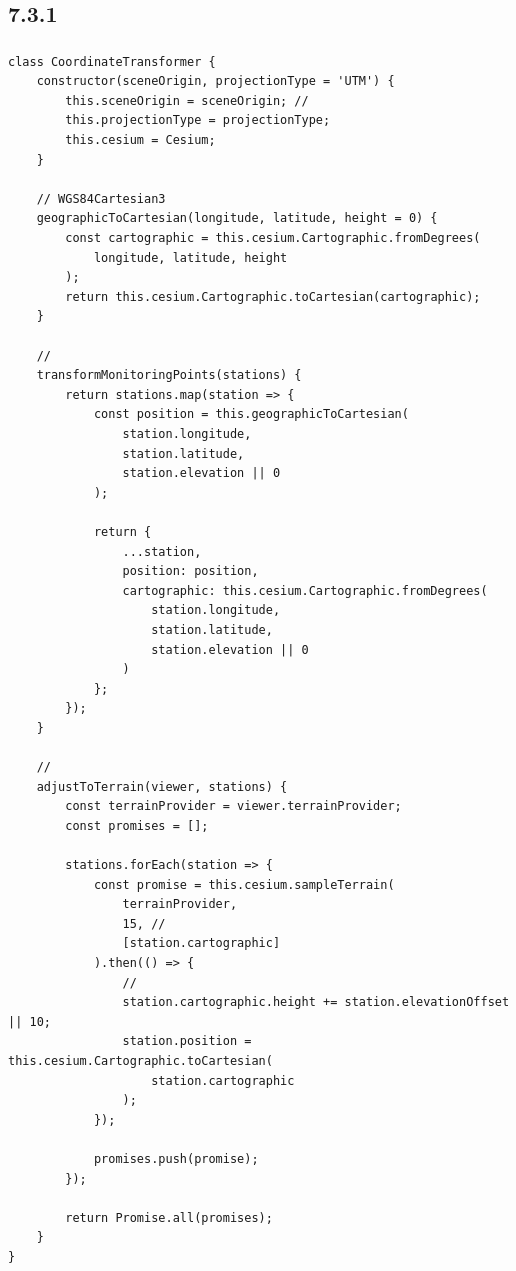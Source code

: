 \hypertarget{section-139}{%
\subsection{7.3.1}\label{section-139}}

\hypertarget{section-140}{%
\subsubsection{}\label{section-140}}

\hypertarget{section-141}{%
\paragraph{}\label{section-141}}

\begin{lstlisting}[style=javascript]
class CoordinateTransformer {
    constructor(sceneOrigin, projectionType = 'UTM') {
        this.sceneOrigin = sceneOrigin; // 
        this.projectionType = projectionType;
        this.cesium = Cesium;
    }
    
    // WGS84Cartesian3
    geographicToCartesian(longitude, latitude, height = 0) {
        const cartographic = this.cesium.Cartographic.fromDegrees(
            longitude, latitude, height
        );
        return this.cesium.Cartographic.toCartesian(cartographic);
    }
    
    // 
    transformMonitoringPoints(stations) {
        return stations.map(station => {
            const position = this.geographicToCartesian(
                station.longitude,
                station.latitude,
                station.elevation || 0
            );
            
            return {
                ...station,
                position: position,
                cartographic: this.cesium.Cartographic.fromDegrees(
                    station.longitude,
                    station.latitude,
                    station.elevation || 0
                )
            };
        });
    }
    
    // 
    adjustToTerrain(viewer, stations) {
        const terrainProvider = viewer.terrainProvider;
        const promises = [];
        
        stations.forEach(station => {
            const promise = this.cesium.sampleTerrain(
                terrainProvider,
                15, // 
                [station.cartographic]
            ).then(() => {
                // 
                station.cartographic.height += station.elevationOffset || 10;
                station.position = this.cesium.Cartographic.toCartesian(
                    station.cartographic
                );
            });
            
            promises.push(promise);
        });
        
        return Promise.all(promises);
    }
}
\end{lstlisting}

